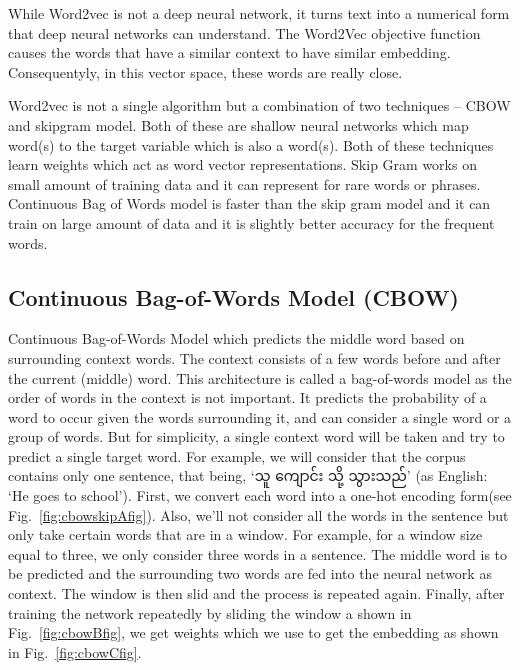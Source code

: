 \documentclass[conference]{IEEEtran}
\begin{document}
While Word2vec is not a deep neural network, it turns text into a numerical form that deep neural networks can understand. The Word2Vec objective function causes the words that have a similar context to have similar embedding. Consequentyly, in this vector space, these words are really close.

Word2vec is not a single algorithm but a combination of two techniques – CBOW and skipgram model. Both of these are shallow neural networks which map word(s) to the target variable which is also a word(s). Both of these techniques learn weights which act as word vector representations. Skip Gram works on small amount of training  data and it can represent for rare words or phrases. Continuous Bag of Words model is faster than the skip gram model and it can train on large amount of  data and it is slightly better accuracy for the frequent words.

\subsection{Continuous Bag-of-Words Model (CBOW)}

Continuous Bag-of-Words Model which predicts the middle word based on surrounding context words. The context consists of a few words before and after the current (middle) word. This architecture is called a bag-of-words model as the order of words in the context is not important. It predicts the probability of a word to occur given the words surrounding it, and can consider a single word or a group of words. But for simplicity, a single context word will be taken and try to predict a single target word. For example, we will consider that the corpus contains only one sentence, that being, `{\padauktext သူ ကျောင်း သို့ သွားသည်}' (as English: `He goes to school').
First, we convert each word into a one-hot encoding form(see Fig.~\ref{fig:cbowskipAfig}). Also, we’ll not consider all the words in the sentence but only take certain words that are in a window. For example, for a window size equal to three, we only consider three words in a sentence. The middle word is to be predicted and the surrounding two words are fed into the neural network as context. The window is then slid and the process is repeated again. Finally, after training the network repeatedly by sliding the window a shown in Fig.~\ref{fig:cbowBfig}, we get weights which we use to get the embedding as shown in Fig.~\ref{fig:cbowCfig}. 
\end{document}
